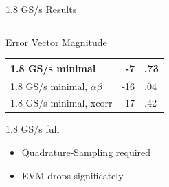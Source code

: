 \documentclass[10pt]{beamer}
\begin{document}
\begin{frame}{1.8 GS/s Results}
\begin{columns}[T]
\begin{column}{.5\textwidth}
\begin{block}{Error Vector Magnitude}
\begin{tabular}{|l|r@{}l|}
          1.8 GS/s minimal                & -7&.73       \\ \hline
          1.8 GS/s minimal, $\alpha\beta$ & -16&.04      \\ \hline
          1.8 GS/s minimal, xcorr         & -17&.42      \\ \hline
        \end{tabular}
      \end{block}
      \begin{block}{1.8 GS/s full}
        \begin{itemize}
        \item Quadrature-Sampling required
        \item EVM drops significately
        \end{itemize}
      \end{block}
    \end{column}
  \end{columns}
\end{frame}
\end{document}
